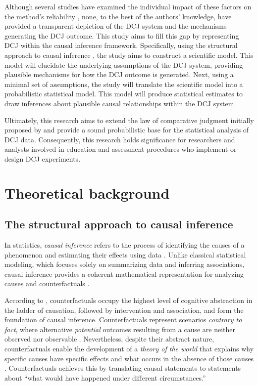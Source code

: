 \documentclass[
  authoryear,
  preprint,
  1p]{elsarticle}
\begin{document}
Although several studies have examined the individual impact of these
factors on the method's reliability
\citep{Bramley_2015, Pollitt_2012b, Bramley_et_al_2019, Verhavert_et_al_2019, Crompvoets_et_al_2022, vanDaal_et_al_2017, Gijsen_et_al_2021},
none, to the best of the authors' knowledge, have provided a transparent
depiction of the DCJ system and the mechanisms generating the DCJ
outcome. This study aims to fill this gap by representing DCJ within the
causal inference framework. Specifically, using the structural approach
to causal inference \citep{Wright_1921, Pearl_2009, Pearl_et_al_2016},
the study aims to construct a scientific model. This model will
elucidate the underlying assumptions of the DCJ system, providing
plausible mechanisms for how the DCJ outcome is generated. Next, using a
minimal set of assumptions, the study will translate the scientific
model into a probabilistic statistical model. This model will produce
statistical estimates to draw inferences about plausible causal
relationships within the DCJ system.

Ultimately, this research aims to extend the law of comparative judgment
initially proposed by \citet{Thurstone_1927} and provide a sound
probabilistic base for the statistical analysis of DCJ data.
Consequently, this research holds significance for researchers and
analysts involved in education and assessment procedures who implement
or design DCJ experiments.

\section{Theoretical background}\label{sec-background}

\subsection{The structural approach to causal
inference}\label{sec-background-structural}

In statistics, \emph{causal inference} refers to the process of
identifying the causes of a phenomenon and estimating their effects
using data \citep{Shaughnessy_et_al_2010, Neal_2020}. Unlike classical
statistical modeling, which focuses solely on summarizing data and
inferring associations, causal inference provides a coherent
mathematical representation for analyzing causes and counterfactuals
\citep{Pearl_2009}.

According to \citet{Pearl_et_al_2018}, counterfactuals occupy the
highest level of cognitive abstraction in the ladder of causation,
followed by intervention and association, and form the foundation of
causal inference. Counterfactuals represent scenarios \emph{contrary to
fact}, where alternative \emph{potential} outcomes resulting from a
cause are neither observed nor observable
\citep{Neal_2020, Counterfactual_2024}. Nevertheless, despite their
abstract nature, counterfactuals enable the development of a
\emph{theory of the world} that explains why specific causes have
specific effects and what occurs in the absence of those causes
\citep{Pearl_et_al_2018}. Counterfactuals achieves this by translating
causal statements to statements about ``what would have happened under
different circumstances.''
\end{document}
